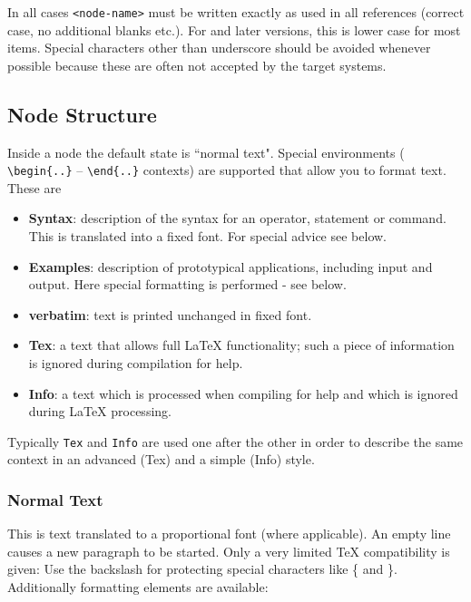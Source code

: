 In all cases \verb|<node-name>| must be written exactly as used in all
references (correct case, no additional blanks etc.).  For  and
later versions, this is lower case for most items.  Special characters
other than underscore should be avoided whenever possible because these
are often not accepted by the target systems.

\subsection{Node Structure}

Inside a node the default state is ``normal text". Special environments (%
\verb|\begin{..}| -- \verb|\end{..}| contexts) are supported that allow you
to format text. These are

\begin{itemize}
\item  {\bf Syntax}: description of the syntax for an operator, statement or
command. This is translated into a fixed font. For special advice see below.

\item  {\bf Examples}: description of prototypical applications, including
input and output. Here special formatting is performed - see below.

\item  {\bf verbatim}: text is printed unchanged in fixed font.

\item  {\bf Tex}: a text that allows full \LaTeX{} functionality; such a
piece of information is ignored during compilation for help.

\item  {\bf Info}: a text which is processed when compiling for help and
which is ignored during \LaTeX{} processing.
\end{itemize}

Typically \verb|Tex| and \verb|Info| are used one after the other in order
to describe the same context in an advanced (Tex) and a simple (Info) style.

\subsubsection{Normal Text}

This is text translated to a proportional font (where applicable). An empty
line causes a new paragraph to be started. Only a very limited \TeX{}
compatibility is given: Use the backslash for protecting special characters
like \{ and \}. Additionally formatting elements are available:

